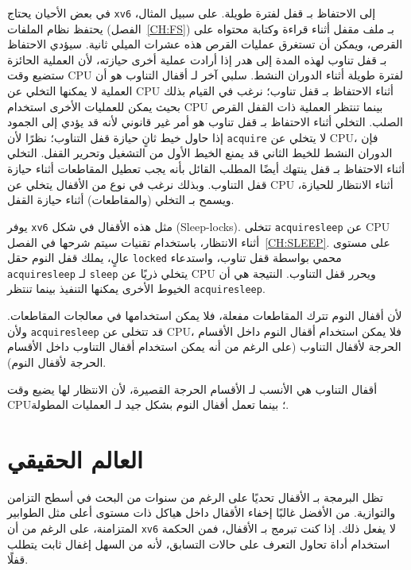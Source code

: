 في بعض الأحيان يحتاج \texttt{xv6} إلى الاحتفاظ بـ قفل لفترة طويلة. على سبيل المثال، يحتفظ نظام الملفات (الفصل~\ref{CH:FS}) بـ ملف مقفل أثناء قراءة وكتابة محتواه على القرص، ويمكن أن تستغرق عمليات القرص هذه عشرات الميلي ثانية.
سيؤدي الاحتفاظ بـ قفل تناوب لهذه المدة إلى هدر إذا أرادت عملية أخرى حيازته، لأن العملية الحائزة ستضيع وقت CPU لفترة طويلة أثناء الدوران النشط.
سلبي آخر لـ أقفال التناوب هو أن العملية لا يمكنها التخلي عن CPU أثناء الاحتفاظ بـ قفل تناوب؛ نرغب في القيام بذلك بحيث يمكن للعمليات الأخرى استخدام CPU بينما تنتظر العملية ذات القفل القرص الصلب.
التخلي أثناء الاحتفاظ بـ قفل تناوب هو أمر غير قانوني لأنه قد يؤدي إلى الجمود إذا حاول خيط ثانٍ حيازة قفل التناوب؛ نظرًا لأن {\tt acquire} لا يتخلي عن CPU، فإن الدوران النشط للخيط الثاني قد يمنع الخيط الأول من التشغيل وتحرير القفل.
التخلي أثناء الاحتفاظ بـ قفل ينتهك أيضًا المطلب القائل بأنه يجب تعطيل المقاطعات أثناء حيازة قفل التناوب.
وبذلك نرغب في نوع من الأقفال يتخلي عن CPU أثناء الانتظار للحيازة، ويسمح بـ التخلي (والمقاطعات) أثناء حيازة القفل.

يوفر \texttt{xv6} مثل هذه الأقفال في شكل  (Sleep-locks).
تتخلى \lstinline{acquiresleep} عن CPU أثناء الانتظار، باستخدام تقنيات سيتم شرحها في الفصل~\ref{CH:SLEEP}.
على مستوى عالٍ، يملك قفل النوم حقل \lstinline{locked} محمي بواسطة قفل تناوب، واستدعاء \lstinline{acquiresleep} لـ \lstinline{sleep} يتخلي ذريًا عن CPU ويحرر قفل التناوب.
النتيجة هي أن الخيوط الأخرى يمكنها التنفيذ بينما تنتظر \lstinline{acquiresleep}.

لأن أقفال النوم تترك المقاطعات مفعلة، فلا يمكن استخدامها في معالجات المقاطعات.
ولأن \lstinline{acquiresleep} قد تتخلى عن CPU، فلا يمكن استخدام أقفال النوم داخل الأقسام الحرجة لأقفال التناوب (على الرغم من أنه يمكن استخدام أقفال التناوب داخل الأقسام الحرجة لأقفال النوم).

أقفال التناوب هي الأنسب لـ الأقسام الحرجة القصيرة، لأن الانتظار لها يضيع وقت CPU؛
بينما تعمل أقفال النوم بشكل جيد لـ العمليات المطولة.

\section{العالم الحقيقي}
\label{sec:real_world_lock}

تظل البرمجة بـ الأقفال تحديًا على الرغم من سنوات من البحث في أسطح التزامن والتوازية.
من الأفضل غالبًا إخفاء الأقفال داخل هياكل ذات مستوى أعلى مثل الطوابير المتزامنة، على الرغم من أن \texttt{xv6} لا يفعل ذلك.
إذا كنت تبرمج بـ الأقفال، فمن الحكمة استخدام أداة تحاول التعرف على حالات التسابق، لأنه من السهل إغفال ثابت يتطلب قفلًا.

